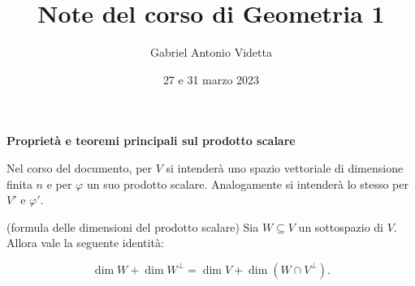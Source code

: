 \documentclass[11pt]{article}
\title{\textbf{Note del corso di Geometria 1}}
\author{Gabriel Antonio Videtta}
\date{27 e 31 marzo 2023}
\begin{document}
	
	\maketitle
	
	\wip
	
	\begin{center}
		\Large \textbf{Proprietà e teoremi principali sul prodotto scalare}
	\end{center}
	
	\begin{note}
		Nel corso del documento, per $V$ si intenderà uno spazio vettoriale di dimensione
		finita $n$ e per $\varphi$ un suo prodotto scalare. Analogamente si intenderà lo stesso
		per $V'$ e $\varphi'$.
	\end{note}
	
	\begin{proposition} (formula delle dimensioni del prodotto scalare)
		Sia $W \subseteq V$ un sottospazio di $V$. Allora vale la seguente identità:
		
		\[ \dim W + \dim W^\perp = \dim V + \dim (W \cap V^\perp). \]
	\end{proposition}
\end{document}
